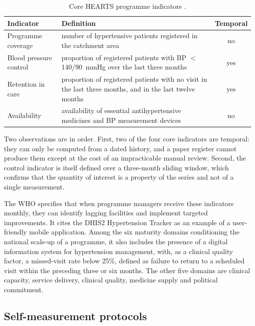 \documentclass[12pt,a4paper,oneside]{report}
\begin{document}
\begin{table}[htbp]
\centering\small
\caption{Core HEARTS programme indicators \parencite{who2023hypertension}.}\label{tab:hearts}
\begin{tabularx}{\textwidth}{@{}>{\raggedright\arraybackslash}p{3.6cm} X c@{}}
\toprule
\textbf{Indicator} & \textbf{Definition} & \textbf{Temporal} \\
\midrule
Programme coverage & number of hypertensive patients registered in the catchment area & no \\
Blood pressure control & proportion of registered patients with BP $<$ 140/90~mmHg over the last three months & yes \\
Retention in care & proportion of registered patients with no visit in the last three months, and in the last twelve months & yes \\
Availability & availability of essential antihypertensive medicines and BP measurement devices & no \\
\bottomrule
\end{tabularx}
\end{table}

Two observations are in order. First, two of the four core indicators are temporal: they can only be computed from a dated history, and a paper register cannot produce them except at the cost of an impracticable manual review. Second, the control indicator is itself defined over a three-month sliding window, which confirms that the quantity of interest is a property of the series and not of a single measurement.

The WHO specifies that when programme managers receive these indicators monthly, they can identify lagging facilities and implement targeted improvements. It cites the DHIS2 Hypertension Tracker as an example of a user-friendly mobile application. Among the six maturity domains conditioning the national scale-up of a programme, it also includes the presence of a digital information system for hypertension management, with, as a clinical quality factor, a missed-visit rate below 25\%, defined as failure to return to a scheduled visit within the preceding three or six months. The other five domains are clinical capacity, service delivery, clinical quality, medicine supply and political commitment.

\subsection{Self-measurement protocols}\label{sec:protocols}
\end{document}
